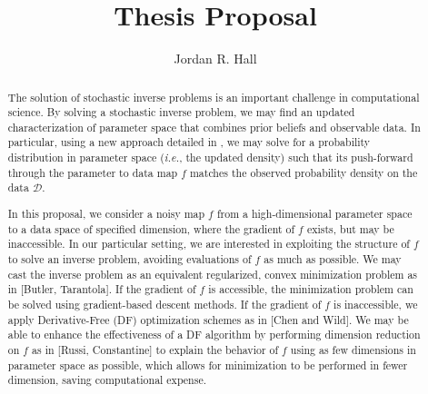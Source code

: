 \documentclass{amsart}
\begin{document}
\title{Thesis Proposal}

\author{Jordan R. Hall}


\maketitle

\begin{abstract}

The solution of stochastic inverse problems is an important challenge in computational science.%
By solving a stochastic inverse problem, we may find an updated  characterization of parameter space that combines  prior beliefs and observable data.
In particular, using a new approach detailed in \cite{Butler}, we may solve for a probability distribution in parameter space ({\em i.e.}, the updated density) such that its push-forward through 
the parameter to data map $f$ matches the observed probability density on the data $\mathcal{D}$.

In this proposal, we consider a noisy map $f$ from a high-dimensional parameter space to a data space of specified dimension, where the gradient of $f$ exists, but may be inaccessible. 
 In our particular setting, we are interested in exploiting the structure of $f$ to solve an inverse problem, avoiding evaluations of $f$ as much as possible. We may cast the inverse problem as an equivalent regularized, convex minimization problem as in [Butler, Tarantola]. If the gradient of $f$ is accessible, the minimization problem can be solved using gradient-based descent methods. If the gradient of $f$ is inaccessible, we apply Derivative-Free (DF) optimization schemes as in [Chen and Wild]. We may be able to enhance the effectiveness of a DF algorithm by performing dimension reduction on $f$ as in [Russi, Constantine] to explain the behavior of $f$ using as few dimensions in parameter space as possible, which allows for minimization to be performed in fewer dimension, saving computational expense.



 
\end{abstract}





\tableofcontents

\setcounter{tocdepth}{0}
\end{document}
